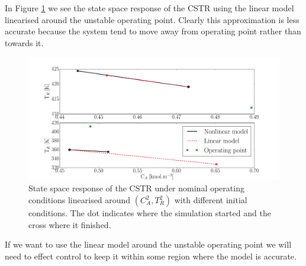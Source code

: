 \documentclass[../masters.tex]{subfiles}
\begin{document}
In Figure \ref{fig_cstr_lin_2} we see the state space response of the CSTR using the linear model linearised around the unstable operating point. Clearly this approximation is less accurate because the system tend to move away from operating point rather than towards it. 
\begin{figure}[H] 
\centering
\includegraphics[scale=0.3]{cstr_lin_2.pdf}
\caption{State space response of the CSTR under nominal operating conditions linearised around $(C_A^2,T_R^2)$ with different initial conditions. The dot indicates where the simulation started and the cross where it finished.}
\label{fig_cstr_lin_2}
\end{figure}
If we want to use the linear model around the unstable operating point we will need to effect control to keep it within some region where the model is accurate.
\end{document}
